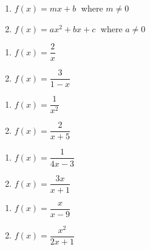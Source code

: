 \begin{multicols}{2}
\begin{enumerate}
\setcounter{enumi}{\value{HW}}

\item $f(x) = mx + b\;$ where $m \neq 0$
\item $f(x) = ax^{2} + bx + c\;$ where $a \neq 0$

\setcounter{HW}{\value{enumi}}
\end{enumerate}
\end{multicols}

\begin{multicols}{2}
\begin{enumerate}
\setcounter{enumi}{\value{HW}}

\item $f(x) = \dfrac{2}{x}$
\item $f(x) = \dfrac{3}{1-x}$

\setcounter{HW}{\value{enumi}}
\end{enumerate}
\end{multicols}

\begin{multicols}{2}
\begin{enumerate}
\setcounter{enumi}{\value{HW}}

\item  $f(x) = \dfrac{1}{x^2}$
\item  $f(x) = \dfrac{2}{x+5}$

\setcounter{HW}{\value{enumi}}
\end{enumerate}
\end{multicols}

\begin{multicols}{2}
\begin{enumerate}
\setcounter{enumi}{\value{HW}}

\item $f(x) = \dfrac{1}{4x-3}$ 
\item $f(x) = \dfrac{3x}{x+1}$ 

\setcounter{HW}{\value{enumi}}
\end{enumerate}
\end{multicols}

\begin{multicols}{2}
\begin{enumerate}
\setcounter{enumi}{\value{HW}}

\item $f(x) = \dfrac{x}{x - 9}$
\item $f(x) = \dfrac{x^2}{2x+1}$

\setcounter{HW}{\value{enumi}}
\end{enumerate}
\end{multicols}

